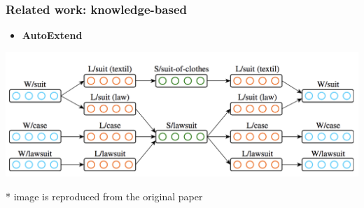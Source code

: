 \begin{frame}
\frametitle{Related work: knowledge-based}
\begin{itemize}
	\item \textbf{AutoExtend}~\cite{rothe-schutze:2015:ACL-IJCNLP}
\end{itemize}
\begin{center}
 \includegraphics[width=1.0\textwidth]{figures/autoextend}
 \end{center}

{\footnotesize
 * image is reproduced from the original paper
}

\end{frame}

